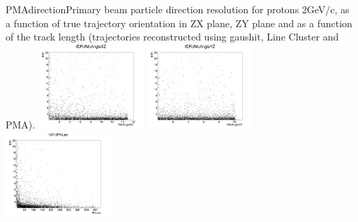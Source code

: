 \begin{cdrfigure}{PMAdirection}{Primary beam particle direction resolution for protons 2GeV/c, as a function of true trajectory orientation in ZX plane, ZY plane and as a function of the track length (trajectories reconstructed using gaushit, Line Cluster and PMA).}
\includegraphics[width=0.3\textwidth]{figures/dFi-vs-beamXZ_primary_ptoton.png}
\includegraphics[width=0.3\textwidth]{figures/dFi-vs-beamYZ_primary_proton.png}
\includegraphics[width=0.3\textwidth]{figures/dFi-vs-TrkLen_primary_proton.png}
\end{cdrfigure}

